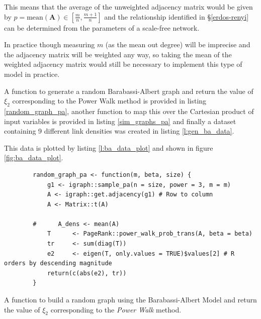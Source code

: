 \documentclass[11pt, twoside]{report}
\begin{document}
This means that the average of the unweighted adjacency matrix would be given by \(p = \mathrm{mean}\left(\mathbf{A}\right) \in \left[ \frac{m}{n}, \frac{m+1}{n} \right]\) and the relationship identified in  \S \ref{erdos-renyi} can be determined from the parameters of a scale-free network.

In practice though measuring \(m\) (as the mean out degree) will be imprecise and the adjacency matrix will be weighted any way, so taking the mean of the weighted adjacency matrix would still be necessary to implement this type of model in practice.

A function to generate a random Barabassi-Albert graph and return the value of
\(\xi_{2}\) corresponding to the Power Walk method is provided in listing
\ref{random_graph_pa}, another function to map this over the Cartesian product of
input variables is provided in listing \ref{sim_graphs_pa} and finally a dataset containing 9
different link densities was created in listing \ref{l:gen_ba_data}.

This data is plotted by listing \ref{l:ba_data_plot} and shown in figure \ref{fig:ba_data_plot}.

\begin{listing}[htbp]
    \begin{tcolorbox}
        \begin{verbatim}
        random_graph_pa <- function(m, beta, size) {
            g1 <- igraph::sample_pa(n = size, power = 3, m = m)
            A <- igraph::get.adjacency(g1) # Row to column
            A <- Matrix::t(A)

        #      A_dens <- mean(A)
            T      <- PageRank::power_walk_prob_trans(A, beta = beta)
            tr     <- sum(diag(T))
            e2     <- eigen(T, only.values = TRUE)$values[2] # R orders by descending magnitude
            return(c(abs(e2), tr))
        }
        \end{verbatim}
    \end{tcolorbox}
\caption{\label{random_graph_pa}A function to build a random graph using the Barabassi-Albert Model and return the value of \(\xi_{2}\) corresponding to the \emph{Power Walk} method.}
\end{listing}
\end{document}
